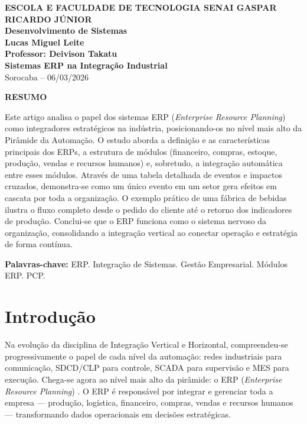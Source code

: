 \documentclass[12pt,a4paper,oneside]{article}
\begin{document}
\begin{center}
  \textbf{\large ESCOLA E FACULDADE DE TECNOLOGIA SENAI GASPAR RICARDO JÚNIOR}\\
  \textbf{Desenvolvimento de Sistemas}\\[1cm]
  \textbf{\Large Lucas Miguel Leite}\\[0.5cm]
  \textbf{Professor: Deivison Takatu}\\[2cm]
  \textbf{\LARGE\textbf{Sistemas ERP na Integração Industrial}}\\[1cm]
  Sorocaba -- 06/03/2026
\end{center}

\vspace{1cm}

\begin{center}
  \textbf{RESUMO}
\end{center}

Este artigo analisa o papel dos sistemas ERP (\textit{Enterprise Resource Planning}) como integradores estratégicos na indústria, posicionando-os no nível mais alto da Pirâmide da Automação. O estudo aborda a definição e as características principais dos ERPs, a estrutura de módulos (financeiro, compras, estoque, produção, vendas e recursos humanos) e, sobretudo, a integração automática entre esses módulos. Através de uma tabela detalhada de eventos e impactos cruzados, demonstra-se como um único evento em um setor gera efeitos em cascata por toda a organização. O exemplo prático de uma fábrica de bebidas ilustra o fluxo completo desde o pedido do cliente até o retorno dos indicadores de produção. Conclui-se que o ERP funciona como o sistema nervoso da organização, consolidando a integração vertical ao conectar operação e estratégia de forma contínua.

\vspace{0.5cm}
\textbf{Palavras-chave:} ERP. Integração de Sistemas. Gestão Empresarial. Módulos ERP. PCP.

\newpage

\section{Introdução}

Na evolução da disciplina de Integração Vertical e Horizontal, compreendeu-se progressivamente o papel de cada nível da automação: redes industriais para comunicação, SDCD/CLP para controle, SCADA para supervisão e MES para execução. Chega-se agora ao nível mais alto da pirâmide: o ERP (\textit{Enterprise Resource Planning}) \cite{caiçara2015}. O ERP é responsável por integrar e gerenciar toda a empresa --- produção, logística, financeiro, compras, vendas e recursos humanos --- transformando dados operacionais em decisões estratégicas.
\end{document}
